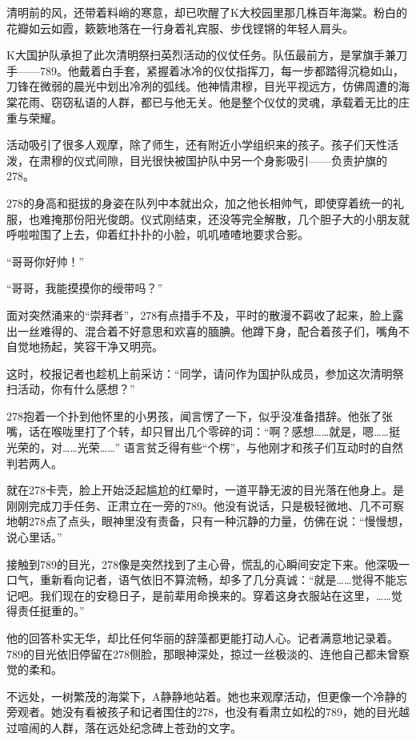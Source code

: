 \documentclass[a4paper]{book}
\begin{document}
清明前的风，还带着料峭的寒意，却已吹醒了K大校园里那几株百年海棠。粉白的花瓣如云如霞，簌簌地落在一行身着礼宾服、步伐铿锵的年轻人肩头。

K大国护队承担了此次清明祭扫英烈活动的仪仗任务。队伍最前方，是掌旗手兼刀手——789。他戴着白手套，紧握着冰冷的仪仗指挥刀，每一步都踏得沉稳如山，刀锋在微弱的晨光中划出冷冽的弧线。他神情肃穆，目光平视远方，仿佛周遭的海棠花雨、窃窃私语的人群，都已与他无关。他是整个仪仗的灵魂，承载着无比的庄重与荣耀。

活动吸引了很多人观摩，除了师生，还有附近小学组织来的孩子。孩子们天性活泼，在肃穆的仪式间隙，目光很快被国护队中另一个身影吸引——负责护旗的278。

278的身高和挺拔的身姿在队列中本就出众，加之他长相帅气，即使穿着统一的礼服，也难掩那份阳光俊朗。仪式刚结束，还没等完全解散，几个胆子大的小朋友就呼啦啦围了上去，仰着红扑扑的小脸，叽叽喳喳地要求合影。

“哥哥你好帅！”

“哥哥，我能摸摸你的绶带吗？”

面对突然涌来的“崇拜者”，278有点措手不及，平时的散漫不羁收了起来，脸上露出一丝难得的、混合着不好意思和欢喜的腼腆。他蹲下身，配合着孩子们，嘴角不自觉地扬起，笑容干净又明亮。

这时，校报记者也趁机上前采访：“同学，请问作为国护队成员，参加这次清明祭扫活动，你有什么感想？”

278抱着一个扑到他怀里的小男孩，闻言愣了一下，似乎没准备措辞。他张了张嘴，话在喉咙里打了个转，却只冒出几个零碎的词：“啊？感想……就是，嗯……挺光荣的，对……光荣……” 语言贫乏得有些“个楞”，与他刚才和孩子们互动时的自然判若两人。

就在278卡壳，脸上开始泛起尴尬的红晕时，一道平静无波的目光落在他身上。是刚刚完成刀手任务、正肃立在一旁的789。他没有说话，只是极轻微地、几不可察地朝278点了点头，眼神里没有责备，只有一种沉静的力量，仿佛在说：“慢慢想，说心里话。”

接触到789的目光，278像是突然找到了主心骨，慌乱的心瞬间安定下来。他深吸一口气，重新看向记者，语气依旧不算流畅，却多了几分真诚：“就是……觉得不能忘记吧。我们现在的安稳日子，是前辈用命换来的。穿着这身衣服站在这里，……觉得责任挺重的。”

他的回答朴实无华，却比任何华丽的辞藻都更能打动人心。记者满意地记录着。789的目光依旧停留在278侧脸，那眼神深处，掠过一丝极淡的、连他自己都未曾察觉的柔和。

不远处，一树繁茂的海棠下，A静静地站着。她也来观摩活动，但更像一个冷静的旁观者。她没有看被孩子和记者围住的278，也没有看肃立如松的789，她的目光越过喧闹的人群，落在远处纪念碑上苍劲的文字。
\end{document}
